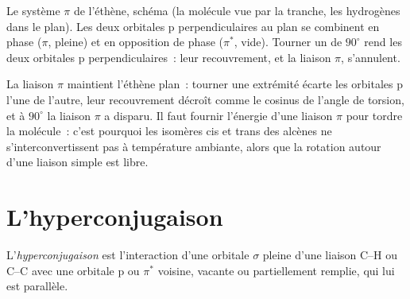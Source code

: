 \begin{omfigure}

{\small Le système $\pi$ de l'éthène, schéma (la molécule vue par la tranche, les
hydrogènes dans le plan). Les deux orbitales p perpendiculaires au plan se combinent
en phase ($\pi$, pleine) et en opposition de phase ($\pi^*$, vide). Tourner un 
de $90^\circ$ rend les deux orbitales p perpendiculaires~: leur recouvrement, et la liaison $\pi$,
s'annulent.}
\end{omfigure}

La liaison $\pi$ maintient l'éthène plan~: tourner une extrémité écarte les orbitales p l'une de
l'autre, leur recouvrement décroît comme le cosinus de l'angle de torsion, et à $90^\circ$
la liaison $\pi$ a disparu. Il faut fournir l'énergie d'une liaison $\pi$ pour tordre la
molécule~: c'est pourquoi les isomères cis et trans des alcènes ne s'interconvertissent pas à
température ambiante, alors que la rotation autour d'une liaison simple est libre.

\section{L'hyperconjugaison}

\begin{definition}[Hyperconjugaison]\label{def:b2:fragment-orbitals:hyperconjugation}
L'\emph{hyperconjugaison} est l'interaction d'une orbitale
$\sigma$ pleine d'une liaison C--H ou C--C avec une orbitale p ou $\pi^*$ voisine, vacante ou
partiellement remplie, qui lui est parallèle.
\end{definition}

